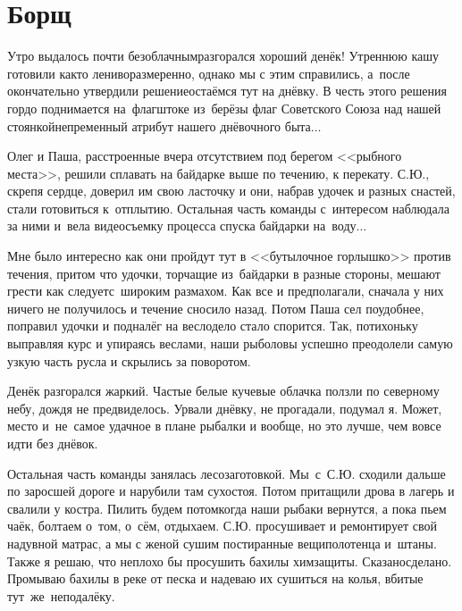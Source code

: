 \chapter{Борщ} 
\vepsianrose

Утро выдалось почти безоблачным\mdash разгорался хороший денёк! Утреннюю кашу готовили как\sdash то лениво\sdash размеренно, однако мы с этим справились, а~после окончательно утвердили решение\mdash остаёмся тут на днёвку. В честь этого решения гордо поднимается на~флагштоке из~берёзы флаг Советского Союза над нашей стоянкой\mdash непременный атрибут нашего днёвочного быта$\ldots$ 

Олег и Паша, расстроенные вчера отсутствием под берегом <<рыбного места>>, решили сплавать на байдарке выше по течению, к перекату. С.Ю., скрепя сердце, доверил им свою ласточку и они, набрав удочек и разных снастей, стали готовиться к~отплытию. Остальная часть команды с~интересом наблюдала за ними и~вела видеосъемку процесса спуска байдарки на~воду$\ldots$
 
Мне было интересно как они пройдут тут в <<бутылочное горлышко>> против течения, притом что удочки, торчащие из~байдарки в разные стороны, мешают грести как следует\mdash с~широким размахом. Как все и предполагали, сначала у них ничего не получилось и течение сносило назад. Потом Паша сел поудобнее, поправил удочки и подналёг на весло\mdash дело стало спорится. Так, потихоньку выправляя курс и упираясь веслами, наши рыболовы успешно преодолели самую узкую часть русла и скрылись за поворотом.

Денёк разгорался жаркий. Частые белые кучевые облачка ползли по северному небу, дождя не предвиделось. Урвали днёвку, не прогадали, подумал я. Может, место и~не~самое удачное в плане рыбалки и вообще, но это лучше, чем вовсе идти без днёвок.

Остальная часть команды занялась лесозаготовкой. Мы~с~С.Ю. сходили дальше по заросшей дороге и нарубили там сухостоя. Потом притащили дрова в лагерь и свалили у костра. Пилить будем потом\mdash когда наши рыбаки вернутся, а пока пьем чаёк, болтаем о~том, о~сём, отдыхаем. С.Ю. просушивает и ремонтирует свой надувной матрас, а мы с женой сушим постиранные вещи\mdash полотенца и~штаны. Также я решаю, что неплохо бы просушить бахилы химзащиты. Сказано\mdash сделано. Промываю бахилы в реке от песка и надеваю их сушиться на колья, вбитые тут~же~неподалёку. 


